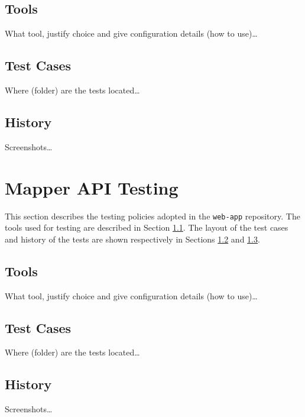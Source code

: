 \documentclass{article}
\begin{document}
    \subsection{Tools}
    \label{sec:ma-tools}

    What tool, justify choice and give configuration details (how to use)\ldots

    \subsection{Test Cases}
    \label{sec:ma-cases}

    Where (folder) are the tests located\ldots

    \subsection{History}
    \label{sec:ma-hist}

    Screenshots\ldots

    \newpage


    \section{Mapper API Testing}
    \label{sec:mapper-api}

    This section describes the testing policies adopted in the \texttt{web-app}
    repository. The tools used for testing are described in Section
    \ref{sec:api-tools}.  The layout of the test cases and history of the tests
    are shown respectively in Sections \ref{sec:api-cases} and
    \ref{sec:api-hist}.

    \subsection{Tools}
    \label{sec:api-tools}

    What tool, justify choice and give configuration details (how to use)\ldots

    \subsection{Test Cases}
    \label{sec:api-cases}

    Where (folder) are the tests located\ldots

    \subsection{History}
    \label{sec:api-hist}

    Screenshots\ldots
\end{document}
